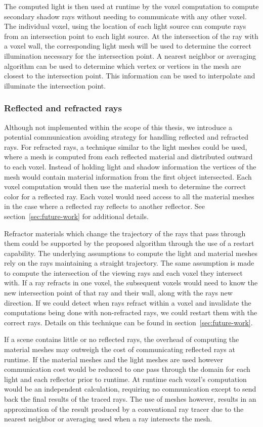 The computed light is then used at runtime by the voxel computation to 
compute secondary shadow rays without needing to communicate with any other 
voxel.  The individual voxel, using the location of each light source can 
compute rays from an intersection point to each light source.  At the 
intersection of the ray with a voxel wall, the corresponding light mesh will be 
used to determine the correct illumination necessary for the intersection point.
A nearest neighbor or averaging algorithm can be used to determine which vertex 
or vertices in the mesh are closest to the intersection point.  This information
can be used to interpolate and illuminate the intersection point.

\subsubsection{Reflected and refracted rays}
Although not implemented within the scope of this thesis, we introduce a 
potential communication avoiding strategy for handling reflected and refracted 
rays.  For refracted rays, a technique similar to the light meshes could be 
used, where a mesh is computed from each reflected material and distributed 
outward to each voxel.  Instead of holding light and shadow information the 
vertices of the mesh would contain material information from the first object 
intersected.  Each voxel computation would then use the material mesh to 
determine the correct color for a reflected ray.  Each voxel would need access 
to all the material meshes in the case where a reflected ray reflects to another
reflector.  See section~\ref{sec:future-work} for additional details.

Refractor materials which change the trajectory of the rays that pass through 
them could be supported by the proposed algorithm through the use of a restart 
capability.  The underlying assumptions to compute the light and material meshes
rely on the rays maintaining a straight trajectory.  The same assumption is made
to compute the intersection of the viewing rays and each voxel they intersect 
with.  If a ray refracts in one voxel, the subsequent voxels would need to know 
the new intersection point of that ray and their wall, along with the rays new 
direction.  If we could detect when rays refract within a voxel and invalidate 
the computations being done with non-refracted rays, we could restart them with 
the correct rays.  Details on this technique can be found in 
section~\ref{sec:future-work}.

If a scene contains little or no reflected rays, the overhead of computing the
material meshes may outweigh the cost of communicating reflected rays at 
runtime.  If the material meshes and the light meshes are used however 
communication cost would be reduced to one pass through the domain for each 
light and each reflector prior to runtime.  At runtime each voxel's computation
would be an independent calculation, requiring no communication except to send
back the final results of the traced rays.  The use of meshes however, results 
in an approximation of the result produced by a conventional ray tracer due to 
the nearest neighbor or averaging used when a ray intersects the mesh.

